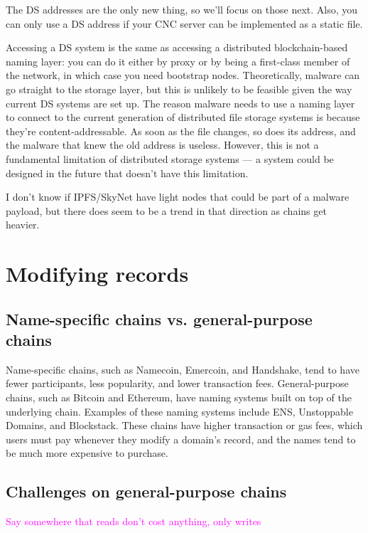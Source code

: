 \documentclass[10pt,sigconf,letterpaper]{acmart}
\newcommand{\randall}{\ding{110}\ding{43}\textcolor{magenta}}
\newcommand{\randall}{}
\begin{document}
The DS addresses are the only new thing, so we'll 
focus on those next. Also, you can only use a DS address if 
your CNC server can be implemented as a static file.

Accessing a DS system is the same as accessing a distributed 
blockchain-based naming layer: you can do it either by proxy 
or by being a first-class member of the network, in which 
case you need bootstrap nodes. Theoretically, malware can go 
straight to the storage layer, but this is unlikely to be 
feasible given the way current DS systems are set up. The 
reason malware needs 
to use a naming layer to connect to the current generation of 
distributed file storage systems is because they're 
content-addressable. As soon as the file changes, so 
does its address, and the malware that knew the old address 
is useless. 
However, this is not a fundamental limitation of distributed 
storage systems --- a system could be designed in the future 
that doesn't have this limitation.

I don't know if IPFS/SkyNet have light nodes that could be 
part of a malware payload, but there does seem to be a trend 
in that direction as chains get heavier.

\section{Modifying records}

\subsection{Name-specific chains vs. general-purpose chains}

Name-specific chains, such as Namecoin, Emercoin, and 
Handshake, tend to have fewer participants, less popularity, 
and lower transaction fees. General-purpose chains, such as 
Bitcoin and Ethereum, have naming systems built on top of the 
underlying chain. Examples of these naming systems include ENS, Unstoppable Domains, and 
Blockstack. These chains have higher transaction or gas fees, which users must pay whenever they 
modify a domain's record, and the names tend to be much more expensive to purchase. 

\subsection{Challenges on general-purpose chains}
\randall{Say somewhere that reads don't cost anything, only writes}
\end{document}
